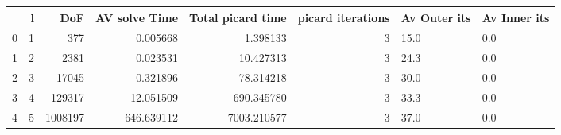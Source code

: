 \begin{tabular}{lrrrrrll}
\toprule
{} &  l &      DoF &  AV solve Time &  Total picard time &  picard iterations & Av Outer its & Av Inner its \\
\midrule
0 &  1 &      377 &       0.005668 &           1.398133 &                  3 &         15.0 &          0.0 \\
1 &  2 &     2381 &       0.023531 &          10.427313 &                  3 &         24.3 &          0.0 \\
2 &  3 &    17045 &       0.321896 &          78.314218 &                  3 &         30.0 &          0.0 \\
3 &  4 &   129317 &      12.051509 &         690.345780 &                  3 &         33.3 &          0.0 \\
4 &  5 &  1008197 &     646.639112 &        7003.210577 &                  3 &         37.0 &          0.0 \\
\bottomrule
\end{tabular}
